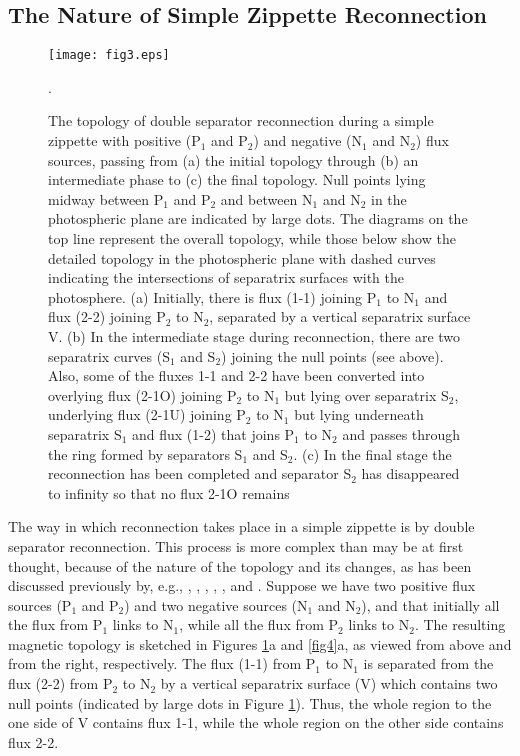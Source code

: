 \documentclass[10pt,namedreferneces]{SolarPhysics}
\begin{document}
\begin{article}
\subsection{\bf The Nature of Simple Zippette Reconnection} 
\label{sect_3.2}
\begin{figure}[h]
{\centering
 \texttt{[image: fig3.eps]}
\caption{The topology of double separator reconnection during a simple zippette with positive  (P$_1$ and P$_2$) and negative (N$_1$ and N$_2$) flux sources, passing from (a) the initial topology through (b) an intermediate phase to (c) the final topology. Null points lying midway between P$_1$ and P$_2$ and between N$_1$ and N$_2$ in the photospheric plane are indicated by large dots. The diagrams on the top line represent the overall topology, while those below show the detailed topology in the photospheric plane with dashed curves indicating the intersections of separatrix surfaces with the photosphere.  (a) Initially, there is flux (1-1) joining P$_1$ to N$_1$ and flux (2-2) joining P$_2$ to N$_2$, separated by a vertical separatrix surface V. (b) In the intermediate stage during reconnection, there are two separatrix curves (S$_1$ and S$_2$) joining the null points (see above). Also, some of the fluxes 1-1 and 2-2 have been converted into 
overlying flux (2-1O) joining P$_2$ to N$_1$ but lying over separatrix S$_2$,  underlying flux (2-1U) joining P$_2$ to N$_1$ but lying underneath separatrix S$_1$ and flux (1-2) that joins P$_1$ to N$_2$ and passes through the ring formed by separators S$_1$ and S$_2$. (c) In the final stage the reconnection has been completed and separator S$_2$ has disappeared to infinity so that no flux 2-1O remains}.
\label{fig3}}
\end{figure}
The way in which reconnection takes place in a simple zippette is by double separator reconnection. This process is more complex than may be at first thought, because of the nature of the topology and its changes, as has been discussed previously by, e.g., , , , , ,  and .  Suppose we have two positive flux sources (P$_1$ and P$_2$) and two negative sources (N$_1$ and N$_2$), and that initially all the flux from P$_1$ links to N$_1$, while all the flux from P$_2$ links to N$_2$. The resulting magnetic topology is sketched in Figures \ref{fig3}a and \ref{fig4}a, as viewed from above and from the right, respectively. The flux (1-1) from P$_1$ to N$_1$ is separated from the flux (2-2) from P$_2$ to N$_2$ by a vertical separatrix surface (V) which contains two null points (indicated by large dots in Figure \ref{fig3}). Thus, the whole region to the one side of V contains flux 1-1, while the whole region on the other side contains flux 2-2.


\end{article}
\end{document}
